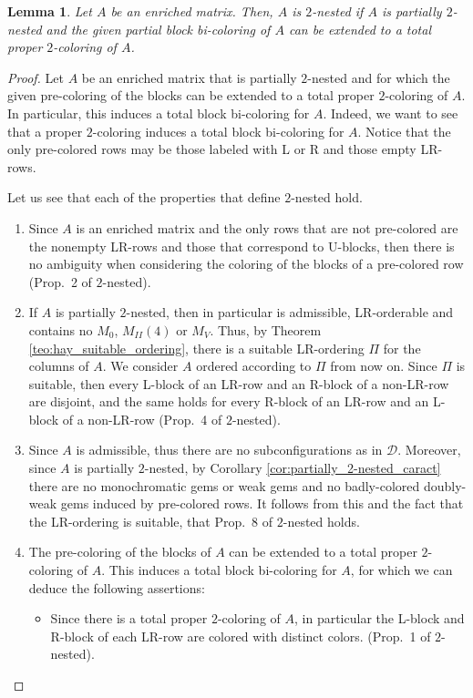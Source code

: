 \documentclass[12pt]{book}
\theoremstyle{plain}
\newtheorem{lema}[teo]{Lemma}
\theoremstyle{remark}
\begin{document}
\begin{lema}  \label{lema:2-nested_if}
	Let $A$ be an enriched matrix. Then, $A$ is \emph{$2$-nested} if $A$ is partially $2$-nested and the given partial block bi-coloring of $A$ can be extended to a total proper $2$-coloring of $A$. %
\end{lema}

\begin{proof}
Let $A$ be an enriched matrix that is partially $2$-nested and for which the given pre-coloring of the blocks can be extended to a total proper $2$-coloring of $A$. In particular, this induces a total block bi-coloring for $A$. Indeed, we want to see that a proper $2$-coloring induces a total block bi-coloring for $A$. 
Notice that the only pre-colored rows may be those labeled with L or R and those empty LR-rows.

Let us see that each of the properties that define $2$-nested hold.

\begin{enumerate}
	\item Since $A$ is an enriched matrix and the only rows that are not pre-colored are the nonempty LR-rows and those that correspond to U-blocks, then there is no ambiguity when considering the coloring of the blocks of a pre-colored row (Prop.\ 2 of $2$-nested).
	
	\item If $A$ is partially $2$-nested, then in particular is admissible, LR-orderable and contains no $M_0$, $M_{II}(4)$ or $M_V$. Thus, by Theorem \ref{teo:hay_suitable_ordering}, there is a suitable LR-ordering $\Pi$ for the columns of $A$. We consider $A$ ordered according to $\Pi$ from now on. Since $\Pi$ is suitable, then every L-block of an LR-row and an R-block of a non-LR-row are disjoint, and the same holds for every R-block of an LR-row and an L-block of a non-LR-row (Prop.\ 4 of $2$-nested). 

	\item Since $A$ is admissible, thus there are no subconfigurations as in $\mathcal{D}$. Moreover, since $A$ is partially $2$-nested, by Corollary \ref{cor:partially_2-nested_caract} there are no monochromatic gems or weak gems and no badly-colored doubly-weak gems induced by pre-colored rows. It follows from this and the fact that the LR-ordering is suitable, that Prop.\ 8 of $2$-nested holds.

	\item The pre-coloring of the blocks of $A$ can be extended to a total proper $2$-coloring of $A$. This induces a total block bi-coloring for $A$, for which we can deduce the following assertions:
	\begin{itemize}
	\item Since there is a total proper $2$-coloring of $A$, in particular the L-block and R-block of each LR-row are colored with distinct colors. (Prop.\ 1 of $2$-nested).
	

\end{itemize}
\end{enumerate}
\end{proof}
\end{document}
